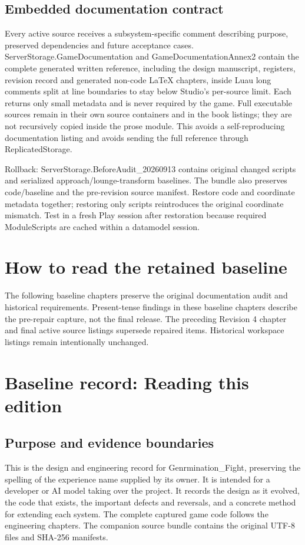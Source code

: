 \section{Embedded documentation contract}
Every active source receives a subsystem-specific comment describing purpose, preserved dependencies and future acceptance cases.\allowbreak{} ServerStorage.\allowbreak{}GameDocumentation and GameDocumentationAnnex2 contain the complete generated written reference, including the design manuscript, registers, revision record and generated non-code LaTeX chapters, inside Luau long comments split at line boundaries to stay below Studio's per-source limit.\allowbreak{} Each returns only small metadata and is never required by the game.\allowbreak{} Full executable sources remain in their own source containers and in the book listings; they are not recursively copied inside the prose module.\allowbreak{} This avoids a self-reproducing documentation listing and avoids sending the full reference through ReplicatedStorage.\allowbreak{}

Rollback: ServerStorage.\allowbreak{}BeforeAudit\_\allowbreak{}20260913 contains original changed scripts and serialized approach/\allowbreak{}lounge-transform baselines.\allowbreak{} The bundle also preserves code/\allowbreak{}baseline and the pre-revision source manifest.\allowbreak{} Restore code and coordinate metadata together; restoring only scripts reintroduces the original coordinate mismatch.\allowbreak{} Test in a fresh Play session after restoration because required ModuleScripts are cached within a datamodel session.\allowbreak{}

\chapter{How to read the retained baseline}
The following baseline chapters preserve the original documentation audit and historical requirements.\allowbreak{} Present-tense findings in these baseline chapters describe the pre-repair capture, not the final release.\allowbreak{} The preceding Revision 4 chapter and final active source listings supersede repaired items.\allowbreak{} Historical workspace listings remain intentionally unchanged.\allowbreak{}

\chapter{Baseline record: Reading this edition}
\section{Purpose and evidence boundaries}
This is the design and engineering record for Genrmination\_\allowbreak{}Fight, preserving the spelling of the experience name supplied by its owner.\allowbreak{} It is intended for a developer or AI model taking over the project.\allowbreak{} It records the design as it evolved, the code that exists, the important defects and reversals, and a concrete method for extending each system.\allowbreak{} The complete captured game code follows the engineering chapters.\allowbreak{} The companion source bundle contains the original UTF-8 files and SHA-256 manifests.\allowbreak{}

